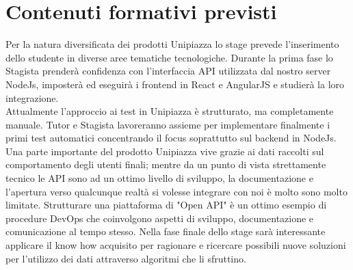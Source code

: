 \section*{Contenuti formativi previsti}
Per la natura diversificata dei prodotti Unipiazza lo stage prevede l'inserimento dello studente in diverse aree tematiche tecnologiche.
Durante la prima fase lo Stagista prenderà confidenza con l'interfaccia API utilizzata dal nostro server NodeJs, imposterà ed eseguirà i frontend in React e AngularJS e studierà la loro integrazione.\\

Attualmente l'approccio ai test in Unipiazza è strutturato, ma completamente manuale. Tutor e Stagista lavoreranno assieme per implementare finalmente i primi test automatici concentrando il focus soprattutto sul backend in NodeJs.\\

Una parte importante del prodotto Unipiazza vive grazie ai dati raccolti sul comportamento degli utenti finali; mentre da un punto di vista strettamente tecnico le API sono ad un ottimo livello di sviluppo, la documentazione e l'apertura verso qualcunque realtà si volesse integrare con noi è molto sono molto limitate.
Strutturare una piattaforma di "Open API" è un ottimo esempio di procedure DevOps che coinvolgono aspetti di sviluppo, documentazione e comunicazione al tempo stesso.
Nella fase finale dello stage sarà interessante applicare il know how acquisito per ragionare e ricercare possibili nuove soluzioni per l'utilizzo dei dati attraverso algoritmi che li sfruttino.\vspace{5mm}
\newpage
